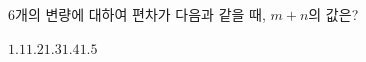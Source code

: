 6개의 변량에 대하여 편차가 다음과 같을 때, $m+n$의 값은? 
\begin{choices32}{$1.1$}{$1.2$}{$1.3$}{$1.4$}{$1.5$}\end{choices32}

